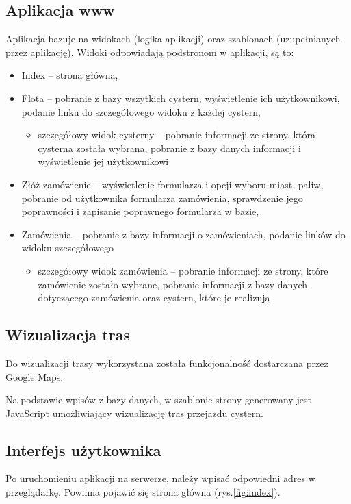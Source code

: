 \documentclass[11pt,a4paper,oneside]{mwart}
\begin{document}
\subsection{Aplikacja www}
Aplikacja bazuje na widokach (logika aplikacji) oraz szablonach (uzupełnianych przez aplikację). Widoki odpowiadają podstronom w aplikacji, są to:
\begin{itemize}
  \item Index -- strona główna,
  \item Flota -- pobranie z bazy wszytkich cystern, wyświetlenie ich użytkownikowi, podanie linku do szczegółowego widoku z każdej cystern,
    \begin{itemize}
      \item szczegółowy widok cysterny -- pobranie informacji ze strony, która cysterna została wybrana, pobranie z bazy danych informacji i wyświetlenie jej użytkownikowi
    \end{itemize}
  \item Złóż zamówienie -- wyświetlenie formularza i opcji wyboru miast, paliw, pobranie od użytkownika formularza zamówienia, sprawdzenie jego poprawności i zapisanie poprawnego formularza w bazie,
  \item Zamówienia -- pobranie z bazy informacji o zamówieniach, podanie linków do widoku szczegółowego
    \begin{itemize}
      \item szczegółowy widok zamówienia -- pobranie informacji ze strony, które zamówienie zostało wybrane, pobranie informacji z bazy danych dotyczącego zamówienia oraz cystern, które je realizują
    \end{itemize}
\end{itemize}

\subsection{Wizualizacja tras}

  Do wizualizacji trasy wykorzystana została funkcjonalność dostarczana przez Google Maps. 

  Na podstawie wpisów z bazy danych, w szablonie strony generowany jest JavaScript umożliwiający wizualizację tras przejazdu cystern.

\subsection{Interfejs użytkownika}
Po uruchomieniu aplikacji na serwerze, należy wpisać odpowiedni adres w przeglądarkę. Powinna pojawić się strona główna (rys.\ref{fig:index}).
\end{document}
